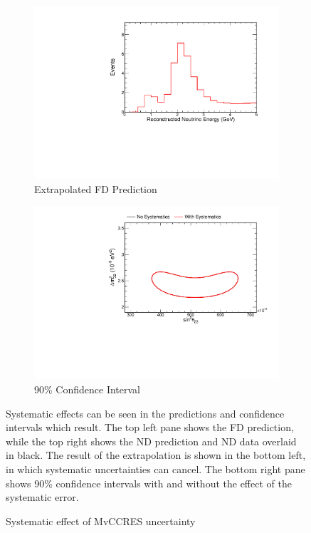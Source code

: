 {\begin{figure}
\begin{center}
\begin{subfigure}[c]{0.49\textwidth}
\includegraphics[width=\textwidth]{figures/systs/prediction/fd_extrap_prediction_MvCCRES.pdf}
\caption*{Extrapolated FD Prediction}
\end{subfigure}
\begin{subfigure}[c]{0.49\textwidth}
\includegraphics[width=\textwidth]{figures/systs/prediction/fd_extrap_contour_MvCCRES.pdf}
\caption*{90\% Confidence Interval}
\end{subfigure}
\end{center}
\caption{Systematic effect of MvCCRES uncertainty}{
Systematic effects can be seen in the predictions and confidence intervals
which result.
The top left pane shows the FD prediction, while the top right shows the
ND prediction and ND data overlaid in black.
The result of the extrapolation is shown in the bottom left, in which
systematic uncertainties can cancel.
The bottom right pane shows 90\% confidence intervals with and without
the effect of the systematic error.}
\label{syst_fig_MvCCRES}


\end{figure}}
